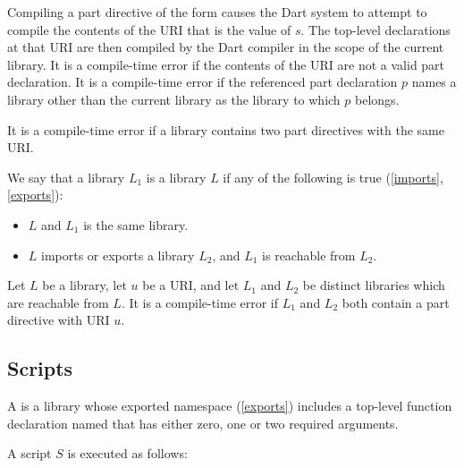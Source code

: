 \documentclass[makeidx]{article}
\begin{document}
{\LMHash{}%
Compiling a part directive of the form  causes the Dart system to attempt to compile the contents of the URI that is the value of $s$.
The top-level declarations at that URI are then compiled by the Dart compiler in the scope of the current library.
It is a compile-time error if the contents of the URI are not a valid part declaration.
It is a compile-time error if the referenced part declaration $p$ names a library other than the current library as the library to which $p$ belongs.

\LMHash{}%
It is a compile-time error if a library contains
two part directives with the same URI.

\LMHash{}%
We say that a library $L_1$ is  a library $L$ if
any of the following is true (\ref{imports}, \ref{exports}):
\begin{itemize}
\item $L$ and $L_1$ is the same library.
\item $L$ imports or exports a library $L_2$, and $L_1$ is reachable from $L_2$.
\end{itemize}

\LMHash{}%
Let $L$ be a library, let $u$ be a URI,
and let $L_1$ and $L_2$ be distinct libraries which are reachable from $L$.
It is a compile-time error if $L_1$ and $L_2$ both contain
a part directive with URI $u$.



\subsection{Scripts}

\LMHash{}%
A  is a library whose exported namespace (\ref{exports}) includes
a top-level function declaration named 
that has either zero, one or two required arguments.

A script $S$ is executed as follows:

}
\end{document}
